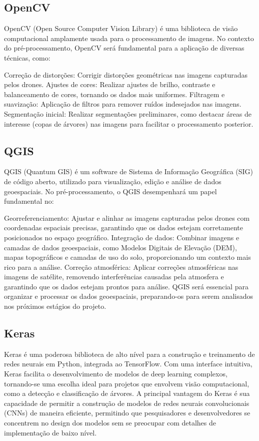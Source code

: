 \documentclass[
    12pt,                   %
    openright,              %
    oneside,                %
    a4paper,                %
    sumario=tradicional,    %
    english,                %
    brazil,                 %
    ]{abntex2}
\begin{document}
\subsection{OpenCV}
    OpenCV (Open Source Computer Vision Library) é uma biblioteca de visão computacional amplamente usada para o processamento de imagens. No contexto do pré-processamento, OpenCV será fundamental para a aplicação de diversas técnicas, como:
    
    Correção de distorções: Corrigir distorções geométricas nas imagens capturadas pelos drones.
    Ajustes de cores: Realizar ajustes de brilho, contraste e balanceamento de cores, tornando os dados mais uniformes.
    Filtragem e suavização: Aplicação de filtros para remover ruídos indesejados nas imagens.
    Segmentação inicial: Realizar segmentações preliminares, como destacar áreas de interesse (copas de árvores) nas imagens para facilitar o processamento posterior.
    
\subsection{QGIS}
    QGIS (Quantum GIS) é um software de Sistema de Informação Geográfica (SIG) de código aberto, utilizado para visualização, edição e análise de dados geoespaciais. No pré-processamento, o QGIS desempenhará um papel fundamental no:
    
    Georreferenciamento: Ajustar e alinhar as imagens capturadas pelos drones com coordenadas espaciais precisas, garantindo que os dados estejam corretamente posicionados no espaço geográfico.
    Integração de dados: Combinar imagens e camadas de dados geoespaciais, como Modelos Digitais de Elevação (DEM), mapas topográficos e camadas de uso do solo, proporcionando um contexto mais rico para a análise.
    Correção atmosférica: Aplicar correções atmosféricas nas imagens de satélite, removendo interferências causadas pela atmosfera e garantindo que os dados estejam prontos para análise.
    QGIS será essencial para organizar e processar os dados geoespaciais, preparando-os para serem analisados nos próximos estágios do projeto.
    
\subsection{Keras}
    Keras é uma poderosa biblioteca de alto nível para a construção e treinamento de redes neurais em Python, integrada ao TensorFlow. Com uma interface intuitiva, Keras facilita o desenvolvimento de modelos de deep learning complexos, tornando-se uma escolha ideal para projetos que envolvem visão computacional, como a detecção e classificação de árvores. A principal vantagem do Keras é sua capacidade de permitir a construção de modelos de redes neurais convolucionais (CNNs) de maneira eficiente, permitindo que pesquisadores e desenvolvedores se concentrem no design dos modelos sem se preocupar com detalhes de implementação de baixo nível.
    
\end{document}
